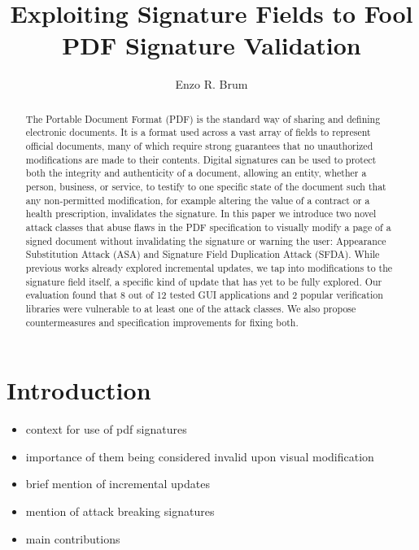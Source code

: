 \documentclass[12pt]{article}
\title{Exploiting Signature Fields to Fool PDF Signature Validation}
\author{Enzo R. Brum\inst{1}}
\begin{document}
\maketitle

\begin{abstract}
	The Portable Document Format (PDF) is the standard way of sharing and defining electronic documents. It is a format used across a vast array of fields to represent official documents, many of which require strong guarantees that no unauthorized modifications are made to their contents. Digital signatures can be used to protect both the integrity and authenticity of a document, allowing an entity, whether a person, business, or service, to testify to one specific state of the document such that any non-permitted modification, for example altering the value of a contract or a health prescription, invalidates the signature. In this paper we introduce two novel attack classes that abuse flaws in the PDF specification to visually modify a page of a signed document without invalidating the signature or warning the user: Appearance Substitution Attack (ASA) and Signature Field Duplication Attack (SFDA). While previous works already explored incremental updates, we tap into modifications to the signature field itself, a specific kind of update that has yet to be fully explored. Our evaluation found that 8 out of 12 tested GUI applications and 2 popular verification libraries were vulnerable to at least one of the attack classes. We also propose countermeasures and specification improvements for fixing both.
\end{abstract}


\section{Introduction}


\begin{itemize}
	\item context for use of pdf signatures
	\item importance of them being considered invalid upon visual modification
	\item brief mention of incremental updates
	\item mention of attack breaking signatures
	\item main contributions
\end{itemize}
\end{document}
